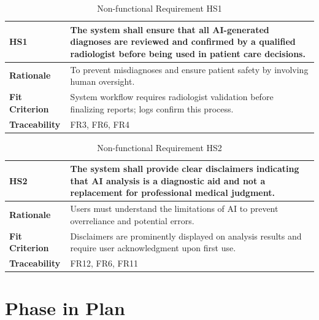 \documentclass[12pt]{article}
\begin{document}
\begin{table}[h!]
\centering
{}
\begin{tabular}{|p{3.5cm}|p{11.5cm}|}
\hline
\rowcolor{gray!30}
\textbf{HS1} & The system shall ensure that all AI-generated diagnoses are reviewed and confirmed by a qualified radiologist before being used in patient care decisions. \\
\hline
\textbf{Rationale} & To prevent misdiagnoses and ensure patient safety by involving human oversight. \\
\hline
\textbf{Fit Criterion} & System workflow requires radiologist validation before finalizing reports; logs confirm this process. \\
\hline
\textbf{Traceability} & FR3, FR6, FR4 \\
\hline
\end{tabular}
\caption{Non-functional Requirement HS1}
\end{table}

\begin{table}[h!]
\centering
{}
\begin{tabular}{|p{3.5cm}|p{11.5cm}|}
\hline
\rowcolor{gray!30}
\textbf{HS2} & The system shall provide clear disclaimers indicating that AI analysis is a diagnostic aid and not a replacement for professional medical judgment. \\
\hline
\textbf{Rationale} & Users must understand the limitations of AI to prevent overreliance and potential errors. \\
\hline
\textbf{Fit Criterion} & Disclaimers are prominently displayed on analysis results and require user acknowledgment upon first use. \\
\hline
\textbf{Traceability} &FR12, FR6, FR11\\
\hline
\end{tabular}
\caption{Non-functional Requirement HS2}
\end{table}

\newpage
\section{Phase in Plan}    
\end{document}
